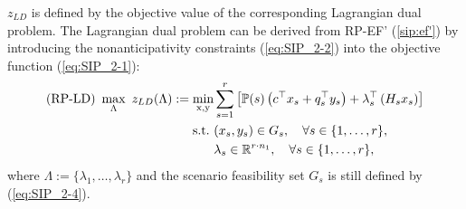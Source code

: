 $z_{LD}$ is defined by the objective value of the corresponding Lagrangian dual problem. The Lagrangian dual problem can be derived from RP-EF' (\ref{sip:ef'}) by introducing the nonanticipativity constraints (\ref{eq:SIP_2-2}) into the objective function (\ref{eq:SIP_2-1}):
\begin{subequations}\label{ld}
	\begin{align}
	\textrm{(RP-LD) }\max_{\Lambda}\ z_{LD}(\Lambda) :=\min_{\mathrm{x},\mathrm{y}}  &\sum_{s=1}^{r}\left[\operatorname*{\mathbb{P}}(s)\left(c^{\top}x_s+q_s^{\top}y_s\right)+\lambda_s^\top \left(H_s x_s\right)\right] \label{ld:obj}\\ 
	\mathrm{s.t.}\ & (x_s,y_s)\in G_s,\quad \forall s\in\{1,\ldots,r\},	 \label{ld:b}\\
	&\lambda_s\in\mathbb{R}^{r\cdot n_1},\quad \forall s\in\{1,\ldots,r\}, \label{ld:c}
	\end{align}
\end{subequations}
where $\Lambda:=\{\lambda_1,\ldots,\lambda_r\}$ and the scenario feasibility set $G_s$ is still defined by (\ref{eq:SIP_2-4}).

%

